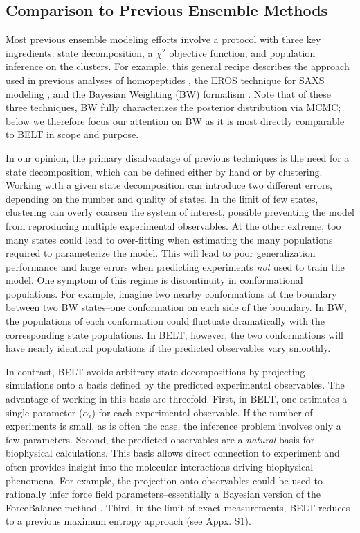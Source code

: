 \documentclass[11pt,titlepage]{article}
\begin{document}
\subsection*{Comparison to Previous Ensemble Methods}

Most previous ensemble modeling efforts involve a protocol with three key ingredients: state decomposition, a $\chi^2$ objective function, and population inference on the clusters.  For example, this general recipe describes the approach used in previous analyses of homopeptides  \citep{Graf2007}, the EROS technique for SAXS modeling  \citep{rozycki2011saxs}, and the Bayesian Weighting (BW) formalism  \citep{fisher2010}.  Note that of these three techniques, BW fully characterizes the posterior distribution via MCMC; below we therefore focus our attention on BW as it is most directly comparable to BELT in scope and purpose.

In our opinion, the primary disadvantage of previous techniques is the need for a state decomposition, which can be defined either by hand or by clustering.  Working with a given state decomposition can introduce two different errors, depending on the number  and quality of states.  In the limit of few states, clustering can overly coarsen the system of interest, possible preventing the model from reproducing multiple experimental observables.  At the other extreme, too many states could lead to over-fitting when estimating the many populations required to parameterize the model.  This will lead to poor generalization performance and large errors when predicting experiments \emph{not} used to train the model.  One symptom of this regime is discontinuity in conformational populations. For example, imagine two nearby conformations at the boundary between two BW states--one conformation on each side of the boundary.  In BW, the populations of each conformation could fluctuate dramatically with the corresponding 
state populations.  In BELT, however, the two conformations will have nearly identical populations if the predicted observables vary smoothly.

In contrast, BELT avoids arbitrary state decompositions by projecting simulations onto a basis defined by the predicted experimental observables.  The advantage of working in this basis are threefold. First, in BELT, one estimates a single parameter ($\alpha_i$) for each experimental observable.  If the number of experiments is small, as is often the case, the inference problem involves only a few parameters.  Second, the predicted observables are a \emph{natural} basis for biophysical calculations.  This basis allows direct connection to experiment and often provides insight into the molecular interactions driving biophysical phenomena.  For example, the projection onto observables could be used to rationally infer force field parameters--essentially a Bayesian version of the ForceBalance method  \citep{wang2012, wang2013systematic}.  Third, in the limit of exact measurements, BELT reduces to a previous  \citep{chodera2012} maximum entropy approach (see Appx. S1).  
\end{document}
